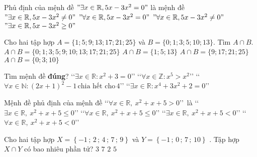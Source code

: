 \begin{ex}%
Phủ định của mệnh đề $"\exists x\in \mathbb{R},5x-3x^2=0"$ là mệnh đề
\choice
{ $"\exists x\in \mathbb{R},5x-3x^2\ne 0"$}
{ $"\forall x\in \mathbb{R},5x-3x^2=0"$}
{\True $"\forall x\in \mathbb{R},5x-3x^2\ne 0"$}
{ $"\exists x\in \mathbb{R},5x-3x^2\ge 0"$}
\end{ex}

\begin{ex}%
Cho hai tập hợp $ A=\{1;5;9;13;17;21;25\} $  và $ B=\{0;1;3;5;10;13\} $. Tìm  $ A\cap B $.
\choice
{$ A\cap B =\{0;1;3;5;9;10;13;17;21;25\}$}
{\True $ A\cap B =\{1;5;13\}$}
{$ A\cap B =\{9;17;21;25\}$}
{$ A\cap B =\{0;3;10\}$}
\end{ex}

\begin{ex}%
Tìm mệnh đề \textbf{đúng}?
\choice
{\lq\lq$\exists x\in\mathbb{R}\colon x^2+3=0$\rq\rq}
{\lq\lq$\forall x\in\mathbb{Z}\colon x^5>x^2$\rq\rq}
{\True \lq\lq$\forall x\in\mathbb{N}\colon (2x+1)^2-1\, \text{chia hết cho}\, 4$\rq\rq}
{\lq\lq$\exists x\in\mathbb{R}\colon x^4+3x^2+2=0$\rq\rq}
\end{ex}


\begin{ex}%
Mệnh đề phủ định của mệnh đề \lq\lq $\forall x\in \mathbb{R}, \ x^2+x+5>0$\rq\rq \ là
\choice
{\True \lq\lq$\exists x\in \mathbb{R},\ x^2+x+5\le 0$\rq\rq }
{\lq\lq$\forall x\in \mathbb{R},\ x^2 +x+5\le 0$\rq\rq}
{\lq\lq$\exists x\in \mathbb{R},\ x^2+x+5<0$\rq\rq	}
{\lq\lq$\forall x\in \mathbb{R},\ x^2+x+5<0$\rq\rq}

\end{ex}


\begin{ex} %
Cho hai tập hợp $X = \left\{ { - 1\,;\,2\,;\,4\,;\,7\,;\,9} \right\}$  và $Y = \left\{ { - 1\,;\,0\,;\,7\,;\,10} \right\}$  . Tập hợp $X \cap Y$  có bao
nhiêu phần tử?
\choice
{ $ 3 $ }
{ $ 7 $ }
{\True $ 2 $ }
{ $ 5 $ }
\end{ex}

